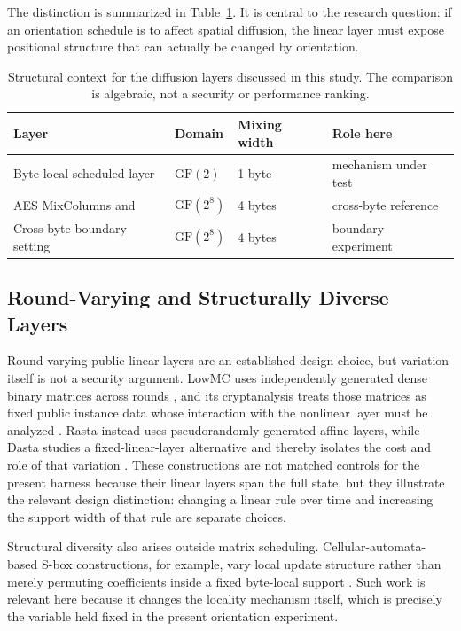 \documentclass[cryptography,article,submit,oneauthor]{Definitions/mdpi}
\begin{document}
The distinction is summarized in Table~\ref{tab:context}. It is central to the research question: if an orientation schedule is to affect spatial diffusion, the linear layer must expose positional structure that can actually be changed by orientation.

\begin{table}[t]
\caption{Structural context for the diffusion layers discussed in this study. The comparison is algebraic, not a security or performance ranking.}\label{tab:context}
\centering\small
\begin{tabular}{@{}llll@{}}
\toprule
Layer & Domain & Mixing width & Role here \\
\midrule
Byte-local scheduled layer & $\mathrm{GF}(2)$ & 1 byte & mechanism under test \\
AES MixColumns \cite{ref5} and \cite{ref6} & $\mathrm{GF}(2^8)$ & 4 bytes & cross-byte reference \\
Cross-byte boundary setting & $\mathrm{GF}(2^8)$ & 4 bytes & boundary experiment \\
\bottomrule
\end{tabular}
\end{table}

\subsection{Round-Varying and Structurally Diverse Layers}\label{sec:2-4}
Round-varying public linear layers are an established design choice, but variation itself is not a security argument. LowMC uses independently generated dense binary matrices across rounds \cite{ref52}, and its cryptanalysis treats those matrices as fixed public instance data whose interaction with the nonlinear layer must be analyzed \cite{ref53}. Rasta instead uses pseudorandomly generated affine layers, while Dasta studies a fixed-linear-layer alternative and thereby isolates the cost and role of that variation \cite{ref58,ref59}. These constructions are not matched controls for the present harness because their linear layers span the full state, but they illustrate the relevant design distinction: changing a linear rule over time and increasing the support width of that rule are separate choices.

Structural diversity also arises outside matrix scheduling. Cellular-automata-based S-box constructions, for example, vary local update structure rather than merely permuting coefficients inside a fixed byte-local support \cite{ref60}. Such work is relevant here because it changes the locality mechanism itself, which is precisely the variable held fixed in the present orientation experiment.
\end{document}
